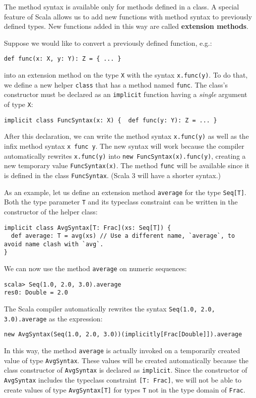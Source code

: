 The method syntax is available only for methods defined in a class.
A special feature of Scala allows us to add new functions with method
syntax to previously defined types. New functions added in this way
are called \textbf{extension methods}. 

Suppose we would like to convert a previously defined function, e.g.:
\begin{lstlisting}
def func(x: X, y: Y): Z = { ... }
\end{lstlisting}
into an extension method on the type \lstinline!X! with the syntax
\lstinline!x.func(y)!. To do that, we define a new helper \lstinline!class!
that has a method named \lstinline!func!. The class\textsf{'}s constructor
must be declared as an \lstinline!implicit! function having a \emph{single}
argument of type \lstinline!X!:
\begin{lstlisting}
implicit class FuncSyntax(x: X) {  def func(y: Y): Z = ... }
\end{lstlisting}
After this declaration, we can write the method syntax \lstinline!x.func(y)!
as well as the infix method syntax \lstinline!x func y!. The new
syntax will work because the compiler automatically rewrites \lstinline!x.func(y)!
into \lstinline!new FuncSyntax(x).func(y)!, creating a new temporary
value \lstinline!FuncSyntax(x)!. The method \lstinline!func! will
be available since it is defined in the class \lstinline!FuncSyntax!.
(Scala 3 will have a shorter syntax.)

As an example, let us define an extension method \lstinline!average!
for the type \lstinline!Seq[T]!. Both the type parameter \lstinline!T!
and its typeclass constraint can be written in the constructor of
the helper class:
\begin{lstlisting}
implicit class AvgSyntax[T: Frac](xs: Seq[T]) {
  def average: T = avg(xs) // Use a different name, `average`, to avoid name clash with `avg`.
}
\end{lstlisting}
We can now use the method \lstinline!average! on numeric sequences:
\begin{lstlisting}
scala> Seq(1.0, 2.0, 3.0).average
res0: Double = 2.0
\end{lstlisting}
The Scala compiler automatically rewrites the syntax \lstinline!Seq(1.0, 2.0, 3.0).average!
as the expression:
\begin{lstlisting}
new AvgSyntax(Seq(1.0, 2.0, 3.0))(implicitly[Frac[Double]]).average
\end{lstlisting}
In this way, the method \lstinline!average! is actually invoked on
a temporarily created value of type \lstinline!AvgSyntax!. These
values will be created automatically because the class constructor
of \lstinline!AvgSyntax! is declared as \lstinline!implicit!. Since
the constructor of \lstinline!AvgSyntax! includes the typeclass constraint
\lstinline![T: Frac]!, we will not be able to create values of type
\lstinline!AvgSyntax[T]! for types \lstinline!T! not in the type
domain of \lstinline!Frac!.

